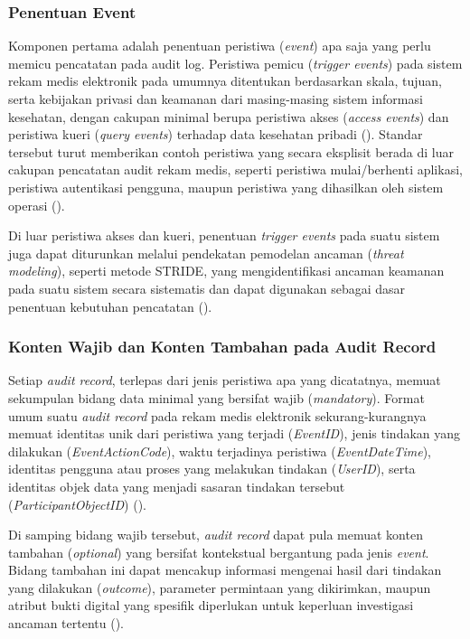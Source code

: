 \subsubsection{Penentuan Event}
\label{subsubsec:penentuan-event}

Komponen pertama adalah penentuan peristiwa (\textit{event}) apa saja
yang perlu memicu pencatatan pada audit log. Peristiwa pemicu
(\textit{trigger events}) pada sistem rekam medis elektronik pada
umumnya ditentukan berdasarkan skala, tujuan, serta kebijakan privasi
dan keamanan dari masing-masing sistem informasi kesehatan, dengan
cakupan minimal berupa peristiwa akses (\textit{access events}) dan
peristiwa kueri (\textit{query events}) terhadap data kesehatan pribadi
(\cite{iso27789_2021}). Standar tersebut turut memberikan contoh
peristiwa yang secara eksplisit berada di luar cakupan pencatatan
audit rekam medis, seperti peristiwa mulai/berhenti aplikasi,
peristiwa autentikasi pengguna, maupun peristiwa yang dihasilkan oleh
sistem operasi (\cite{iso27789_2021}).

Di luar peristiwa akses dan kueri, penentuan \textit{trigger events}
pada suatu sistem juga dapat diturunkan melalui pendekatan pemodelan
ancaman (\textit{threat modeling}), seperti metode STRIDE, yang
mengidentifikasi ancaman keamanan pada suatu sistem secara sistematis
dan dapat digunakan sebagai dasar penentuan kebutuhan pencatatan
(\cite{laksono2021stride}).

\subsubsection{Konten Wajib dan Konten Tambahan pada Audit Record}
\label{subsubsec:konten-event}

Setiap \textit{audit record}, terlepas dari jenis peristiwa apa yang
dicatatnya, memuat sekumpulan bidang data minimal yang bersifat wajib
(\textit{mandatory}). Format umum suatu \textit{audit record} pada
rekam medis elektronik sekurang-kurangnya memuat identitas unik dari
peristiwa yang terjadi (\textit{EventID}), jenis tindakan yang
dilakukan (\textit{EventActionCode}), waktu terjadinya peristiwa
(\textit{EventDateTime}), identitas pengguna atau proses yang melakukan
tindakan (\textit{UserID}), serta identitas objek data yang menjadi
sasaran tindakan tersebut (\textit{ParticipantObjectID})
(\cite{iso27789_2021}).

Di samping bidang wajib tersebut, \textit{audit record} dapat pula
memuat konten tambahan (\textit{optional}) yang bersifat kontekstual
bergantung pada jenis \textit{event}. Bidang tambahan ini dapat
mencakup informasi mengenai hasil dari tindakan yang dilakukan
(\textit{outcome}), parameter permintaan yang dikirimkan, maupun
atribut bukti digital yang spesifik diperlukan untuk keperluan
investigasi ancaman tertentu (\cite{iso27789_2021}).

